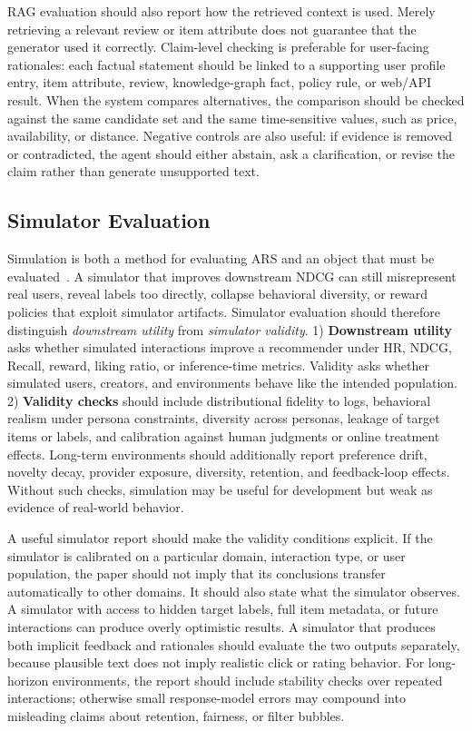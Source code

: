 RAG evaluation should also report how the retrieved context is used. Merely retrieving a relevant review or item attribute does not guarantee that the generator used it correctly. Claim-level checking is preferable for user-facing rationales: each factual statement should be linked to a supporting user profile entry, item attribute, review, knowledge-graph fact, policy rule, or web/API result. When the system compares alternatives, the comparison should be checked against the same candidate set and the same time-sensitive values, such as price, availability, or distance. Negative controls are also useful: if evidence is removed or contradicted, the agent should either abstain, ask a clarification, or revise the claim rather than generate unsupported text.

\subsection{Simulator Evaluation}
\label{subsec:simulator-eval}

Simulation is both a method for evaluating ARS and an object that must be evaluated~\cite{yoon2024evaluating, zhang2026exploring}. A simulator that improves downstream NDCG can still misrepresent real users, reveal labels too directly, collapse behavioral diversity, or reward policies that exploit simulator artifacts. Simulator evaluation should therefore distinguish \emph{downstream utility} from \emph{simulator validity}. 
1) \textbf{Downstream utility} asks whether simulated interactions improve a recommender under HR, NDCG, Recall, reward, liking ratio, or inference-time metrics. Validity asks whether simulated users, creators, and environments behave like the intended population. 
2) \textbf{Validity checks} should include distributional fidelity to logs, behavioral realism under persona constraints, diversity across personas, leakage of target items or labels, and calibration against human judgments or online treatment effects. Long-term environments should additionally report preference drift, novelty decay, provider exposure, diversity, retention, and feedback-loop effects. Without such checks, simulation may be useful for development but weak as evidence of real-world behavior.



A useful simulator report should make the validity conditions explicit. If the simulator is calibrated on a particular domain, interaction type, or user population, the paper should not imply that its conclusions transfer automatically to other domains. It should also state what the simulator observes. A simulator with access to hidden target labels, full item metadata, or future interactions can produce overly optimistic results. A simulator that produces both implicit feedback and rationales should evaluate the two outputs separately, because plausible text does not imply realistic click or rating behavior. For long-horizon environments, the report should include stability checks over repeated interactions; otherwise small response-model errors may compound into misleading claims about retention, fairness, or filter bubbles.


